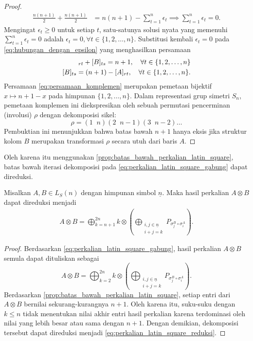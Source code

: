 \begin{proof}
  \begin{align*}
    \frac{n(n+1)}{2} + \frac{n(n+1)}{2} & = n(n+1) - \sum_{t=1}^n \epsilon_t \implies
    \sum_{t=1}^n \epsilon_t              = 0.
  \end{align*}
  Mengingat $\epsilon_t \ge 0$ untuk setiap $t$, satu-satunya solusi nyata yang memenuhi $\sum_{t=1}^n \epsilon_t = 0$ adalah $\epsilon_t = 0, \forall t\in\{1,2,\dots,n\}$. Substitusi kembali $\epsilon_t = 0$ pada \eqref{eq:hubungan_dengan_epsilon} yang menghasilkan persamaan
  \begin{align}
    [A]_{rt} + [B]_{ts} = n+1, \quad \forall t \in \{1, 2, \ldots, n\}\notag \\
    [B]_{ts} = (n+1) - [A]_{rt}, \quad \forall t \in \{1, 2, \ldots, n\}. \label{eq:persamaan_komplemen}
  \end{align}
  Persamaan \eqref{eq:persamaan_komplemen} merupakan pemetaan bijektif $x \mapsto n+1-x$ pada himpunan $\{1, 2, \ldots, n\}$. Dalam representasi grup simetri $S_n$, pemetaan komplemen ini diekspresikan oleh sebuah permutasi pencerminan (involusi) $\rho$ dengan dekomposisi sikel:
  \[
    \rho = (1\;\; n)(2\;\; n-1)(3\;\; n-2)\ldots
  \]
  Pembuktian ini menunjukkan bahwa batas bawah $n+1$ hanya eksis jika struktur kolom $B$ merupakan transformasi $\rho$ secara utuh dari baris $A$.
\end{proof}

Oleh karena itu menggunakan \autoref{prop:batas_bawah_perkalian_latin_square}, batas bawah iterasi dekomposisi pada \eqref{eq:perkalian_latin_square_gabung} dapat direduksi.
\begin{akibat}\label{col:reduksi_iterasi_perkalian_latin_square}
  Misalkan $A,B\in L_S(n)$ dengan himpunan simbol $\underline{n}$. Maka hasil perkalian $A\otimes B$ dapat direduksi menjadi
  \begin{align}\label{eq:perkalian_latin_square_reduksi}
    A \otimes B
    =
    \bigoplus_{k=n+1}^{2n}
    k \otimes
    \left(
    \bigoplus_{\substack{i,j \in \underline{n} \\ i+j=k}}
    P_{\sigma_j^B \circ \sigma_i^A}
    \right).
  \end{align}
\end{akibat}
\begin{proof}
  Berdasarkan \eqref{eq:perkalian_latin_square_gabung}, hasil perkalian $A\otimes B$ semula dapat dituliskan sebagai
  \[
    A \otimes B
    =
    \bigoplus_{k=2}^{2n}
    k \otimes
    \left(
    \bigoplus_{\substack{i,j \in \underline{n} \\ i+j=k}}
    P_{\sigma_j^B \circ \sigma_i^A}
    \right).
  \]
  Berdasarkan \autoref{prop:batas_bawah_perkalian_latin_square}, setiap entri dari $A\otimes B$ bernilai sekurang-kurangnya $n+1$. Oleh karena itu, suku-suku dengan $k\le n$ tidak menentukan nilai akhir entri hasil perkalian karena terdominasi oleh nilai yang lebih besar atau sama dengan $n+1$. Dengan demikian, dekomposisi tersebut dapat direduksi menjadi \eqref{eq:perkalian_latin_square_reduksi}.
\end{proof}

